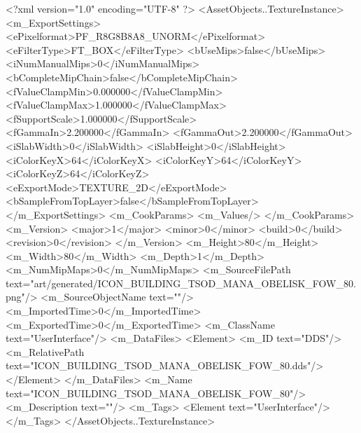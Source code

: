 <?xml version="1.0" encoding="UTF-8" ?>
<AssetObjects..TextureInstance>
	<m_ExportSettings>
		<ePixelformat>PF_R8G8B8A8_UNORM</ePixelformat>
		<eFilterType>FT_BOX</eFilterType>
		<bUseMips>false</bUseMips>
		<iNumManualMips>0</iNumManualMips>
		<bCompleteMipChain>false</bCompleteMipChain>
		<fValueClampMin>0.000000</fValueClampMin>
		<fValueClampMax>1.000000</fValueClampMax>
		<fSupportScale>1.000000</fSupportScale>
		<fGammaIn>2.200000</fGammaIn>
		<fGammaOut>2.200000</fGammaOut>
		<iSlabWidth>0</iSlabWidth>
		<iSlabHeight>0</iSlabHeight>
		<iColorKeyX>64</iColorKeyX>
		<iColorKeyY>64</iColorKeyY>
		<iColorKeyZ>64</iColorKeyZ>
		<eExportMode>TEXTURE_2D</eExportMode>
		<bSampleFromTopLayer>false</bSampleFromTopLayer>
	</m_ExportSettings>
	<m_CookParams>
		<m_Values/>
	</m_CookParams>
	<m_Version>
		<major>1</major>
		<minor>0</minor>
		<build>0</build>
		<revision>0</revision>
	</m_Version>
	<m_Height>80</m_Height>
	<m_Width>80</m_Width>
	<m_Depth>1</m_Depth>
	<m_NumMipMaps>0</m_NumMipMaps>
	<m_SourceFilePath text="art/generated/ICON_BUILDING_TSOD_MANA_OBELISK_FOW_80.png"/>
	<m_SourceObjectName text=""/>
	<m_ImportedTime>0</m_ImportedTime>
	<m_ExportedTime>0</m_ExportedTime>
	<m_ClassName text="UserInterface"/>
	<m_DataFiles>
		<Element>
			<m_ID text="DDS"/>
			<m_RelativePath text="ICON_BUILDING_TSOD_MANA_OBELISK_FOW_80.dds"/>
		</Element>
	</m_DataFiles>
	<m_Name text="ICON_BUILDING_TSOD_MANA_OBELISK_FOW_80"/>
	<m_Description text=""/>
	<m_Tags>
		<Element text="UserInterface"/>
	</m_Tags>
</AssetObjects..TextureInstance>
